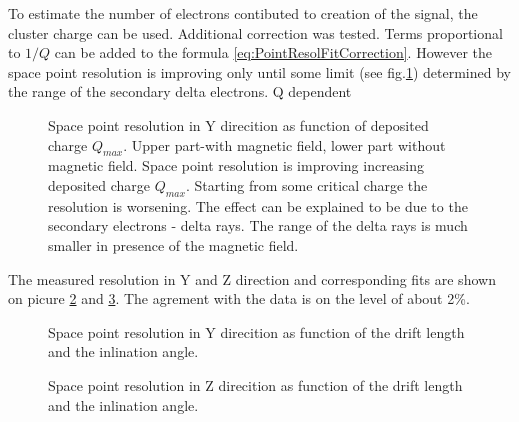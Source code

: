 \documentclass[a4paper,12pt]{article}
\begin{document}
To estimate the number of electrons contibuted to creation of the signal, the cluster charge can be used. Additional correction was tested. Terms proportional to $1/Q$ can be  added to the formula \ref{eq:PointResolFitCorrection}. However the space point resolution is improving only until some limit (see fig.\ref{figPointResolYQ}) determined by the range of the secondary delta electrons. Q dependent 

\begin{figure}
  \centering{}
  \centering{}
 \label{figPointResolYQ} 
\caption{Space point resolution in Y direcition as function of deposited charge $Q_{max}$.
Upper part-with magnetic field, lower part without magnetic field. Space point resolution is improving increasing deposited charge $Q_{max}$. Starting from some critical charge the resolution is worsening.  The effect can be explained to be due to the secondary electrons - delta rays. The range of the delta rays is much smaller in presence of the magnetic field.
}

\end{figure}


The measured resolution in Y and Z direction and corresponding fits are shown on picure \ref{figPointResolYDRTAN} and \ref{figPointResolZDRTAN}. The agrement with the data is on the level of about 2\%. 




\begin{figure}
  \centering{}
  \centering{}
  \centering{}
  \caption{Space point resolution in Y direcition as function of the drift length and the inlination angle.}
  \label{figPointResolYDRTAN}
\end{figure}

\begin{figure}
  \centering{}
  \centering{}
  \centering{}
  \caption{Space point resolution in Z direcition as function of the drift length and the inlination angle.}
  \label{figPointResolZDRTAN}
\end{figure}
\end{document}
